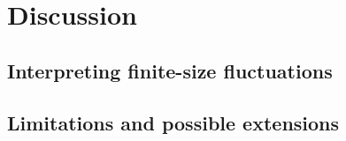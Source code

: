 \section{Discussion}
\label{sec:discussion}

\subsection{Interpreting finite-size fluctuations}
\label{sec:structural-interpretation}

\subsection{Limitations and possible extensions}
\label{sec:limitations-and-extensions}

\par\allowbreak
